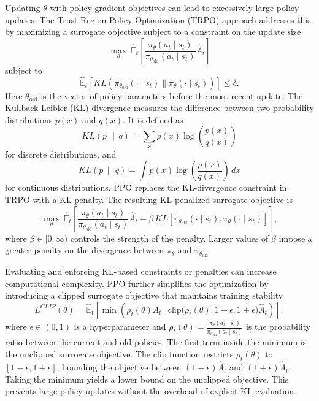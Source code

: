 \documentclass[12pt,a4paper,reqno]{amsart}
\theoremstyle{definition}
\theoremstyle{remark}
\theoremstyle{plain}
\begin{document}
Updating $\theta$ with policy-gradient objectives can lead to excessively large policy updates. The Trust Region Policy Optimization (TRPO) approach addresses this by maximizing a surrogate objective subject to a constraint on the update size \cite{schulman2015trust}
\begin{equation}
\max_{\theta} \ \hat{\mathbb{E}}_t \left[
\frac{\pi_{\theta}(a_t \mid s_t)}
{\pi_{\theta_{\text{old}}}(a_t \mid s_t)}
\hat{A}_t
\right]
\end{equation}
subject to
\begin{equation}
\hat{\mathbb{E}}_t \left[
KL\left(
\pi_{\theta_{\text{old}}}(\cdot \mid s_t)\|
\pi_{\theta}(\cdot \mid s_t)
\right)
\right]
\leq \delta.
\end{equation}
Here $\theta_{\text{old}}$ is the vector of policy parameters before the most recent update. The Kullback-Leibler (KL) divergence measures the difference between two probability distributions $p(x)$ and $q(x)$. It is defined as
\begin{equation}
KL(p \,\|\, q)
=
\sum_x p(x)
\log\left(
\frac{p(x)}{q(x)}
\right)
\end{equation}
for discrete distributions, and
\begin{equation}
KL(p \,\|\, q)
=
\int p(x)
\log\left(
\frac{p(x)}{q(x)}
\right)\,dx
\end{equation}
for continuous distributions. PPO replaces the KL-divergence constraint in TRPO with a KL penalty. The resulting KL-penalized surrogate objective is
\begin{equation}
\max_{\theta} \ \hat{\mathbb{E}}_t \left[
\frac{\pi_{\theta}(a_t \mid s_t)}
{\pi_{\theta_{\text{old}}}(a_t \mid s_t)}
\hat{A}_t
- \beta \,
KL\left[
\pi_{\theta_{\text{old}}}(\cdot \mid s_t),
\pi_{\theta}(\cdot \mid s_t)
\right]
\right],
\end{equation}
where $\beta \in [0, \infty)$ controls the strength of the penalty. Larger values of $\beta$ impose a greater penalty on the divergence between $\pi_{\theta}$ and $\pi_{\theta_{\text{old}}}$.

Evaluating and enforcing KL-based constraints or penalties can increase computational complexity. PPO further simplifies the optimization by introducing a clipped surrogate objective that maintains training stability
\begin{equation}
L^{CLIP}(\theta)
=
\hat{\mathbb{E}}_t
\left[
\min
\left(
\rho_t(\theta)\hat{A}_t,
\;
\text{clip}\bigl(\rho_t(\theta), 1-\epsilon, 1+\epsilon\bigr)\hat{A}_t
\right)
\right],
\end{equation}
where $\epsilon \in (0, 1)$ is a hyperparameter and $\rho_t(\theta)=
\frac{
\pi_{\theta}(a_t \mid s_t)
}{
\pi_{\theta_{\text{old}}}(a_t \mid s_t)
}$ is the probability ratio between the current and old policies. The first term inside the minimum is the unclipped surrogate objective. The clip function restricts $\rho_t(\theta)$ to $[1-\epsilon,1+\epsilon]$, bounding the objective between $(1-\epsilon)\hat{A}_t$ and $(1+\epsilon)\hat{A}_t$. Taking the minimum yields a lower bound on the unclipped objective. This prevents large policy updates without the overhead of explicit KL evaluation.
\end{document}
